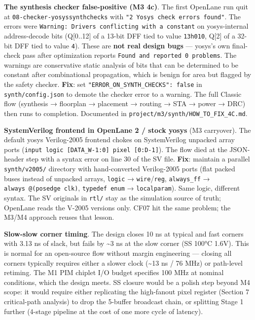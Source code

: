 \documentclass[
  10pt,
]{article}
\begin{document}
\textbf{The synthesis checker false-positive (M3 4c)}. The first
OpenLane run quit at \texttt{08-checker-yosyssynthchecks} with
\texttt{"2\ Yosys\ check\ errors\ found"}. The errors were
\texttt{Warning:\ Drivers\ conflicting\ with\ a\ constant} on
yosys-internal address-decode bits (Q{[}0..12{]} of a 13-bit DFF tied to
value \texttt{13\textquotesingle{}h010}, Q{[}2{]} of a 32-bit DFF tied
to value \texttt{4}). These are \textbf{not real design bugs} ---
yosys's own final-check pass after optimization reports
\texttt{Found\ and\ reported\ 0\ problems}. The warnings are
conservative static analysis of bits that can be determined to be
constant after combinational propagation, which is benign for area but
flagged by the safety checker. \textbf{Fix}: set
\texttt{"ERROR\_ON\_SYNTH\_CHECKS":\ false} in
\texttt{synth/config.json} to demote the checker error to a warning. The
full Classic flow (synthesis → floorplan → placement → routing → STA →
power → DRC) then runs to completion. Documented in
\texttt{project/m3/synth/HOW\_TO\_FIX\_4C.md}.

\textbf{SystemVerilog frontend in OpenLane 2 / stock yosys} (M3
carryover). The default yosys Verilog-2005 frontend chokes on
SystemVerilog unpacked array ports
(\texttt{input\ logic\ {[}DATA\_W-1:0{]}\ pixel\ {[}0:D-1{]}}). The flow
died at the JSON-header step with a syntax error on line 30 of the SV
file. \textbf{Fix}: maintain a parallel \texttt{synth/v2005/} directory
with hand-converted Verilog-2005 ports (flat packed buses instead of
unpacked arrays, \texttt{logic} → \texttt{wire}/\texttt{reg},
\texttt{always\_ff} → \texttt{always\ @(posedge\ clk)},
\texttt{typedef\ enum} → \texttt{localparam}). Same logic, different
syntax. The SV originals in \texttt{rtl/} stay as the simulation source
of truth; OpenLane reads the V-2005 versions only. CF07 hit the same
problem; the M3/M4 approach reuses that lesson.

\textbf{Slow-slow corner timing}. The design closes 10 ns at typical and
fast corners with 3.13 ns of slack, but fails by \textasciitilde3 ns at
the slow corner (SS 100°C 1.6V). This is normal for an open-source flow
without margin engineering --- closing all corners typically requires
either a slower clock (\textasciitilde13 ns / 76 MHz) or path-level
retiming. The M1 PIM chiplet I/O budget specifies 100 MHz at nominal
conditions, which the design meets. SS closure would be a polish step
beyond M4 scope: it would require either replicating the high-fanout
pixel register (Section 7 critical-path analysis) to drop the 5-buffer
broadcast chain, or splitting Stage 1 further (4-stage pipeline at the
cost of one more cycle of latency).
\end{document}
